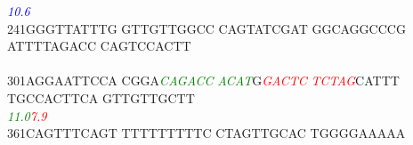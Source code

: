 \documentclass[11pt,twoside,reqno,a4paper]{article}
\begin{document}
{\hspace*{4\charwidth}\hspace*{1\charwidth}\hspace*{1\charwidth}\hspace*{1\charwidth}\hspace*{1\charwidth}\hspace*{43\charwidth}\textit{\textcolor{Blue}{10.6}}\hspace*{1\charwidth}\hspace*{1\charwidth}\\
241\hspace*{1\charwidth}GGGTTATTTG	GTTGTTGGCC	CAGTATCGAT	GGCAGGCCCG	ATTTTAGACC	CAGTCCACTT	\\
\hspace*{4\charwidth}\hspace*{1\charwidth}\hspace*{1\charwidth}\hspace*{1\charwidth}\hspace*{1\charwidth}\hspace*{1\charwidth}\hspace*{1\charwidth}\\
301\hspace*{1\charwidth}AGGAATTCCA	CGGA\textit{\textcolor{Green}{C}}\textit{\textcolor{Green}{A}}\textit{\textcolor{Green}{G}}\textit{\textcolor{Green}{A}}\textit{\textcolor{Green}{C}}\textit{\textcolor{Green}{C}}	\textit{\textcolor{Green}{A}}\textit{\textcolor{Green}{C}}\textit{\textcolor{Green}{A}}\textit{\textcolor{Green}{T}}G\textit{\textcolor{Red}{G}}\textit{\textcolor{Red}{A}}\textit{\textcolor{Red}{C}}\textit{\textcolor{Red}{T}}\textit{\textcolor{Red}{C}}	\textit{\textcolor{Red}{T}}\textit{\textcolor{Red}{C}}\textit{\textcolor{Red}{T}}\textit{\textcolor{Red}{A}}\textit{\textcolor{Red}{G}}CATTT	TGCCACTTCA	GTTGTTGCTT	\\
\hspace*{4\charwidth}\hspace*{1\charwidth}\hspace*{14\charwidth}\textit{\textcolor{Green}{11.0}}\hspace*{1\charwidth}\hspace*{7\charwidth}\textit{\textcolor{Red}{7.9}}\hspace*{1\charwidth}\hspace*{1\charwidth}\hspace*{1\charwidth}\hspace*{1\charwidth}\\
361\hspace*{1\charwidth}CAGTTTCAGT	TTTTTTTTTC	CTAGTTGCAC	TGGGGAAAAA	\\
\hspace*{4\charwidth}\hspace*{1\charwidth}\hspace*{1\charwidth}\hspace*{1\charwidth}\hspace*{1\charwidth}\\
}
\end{document}

